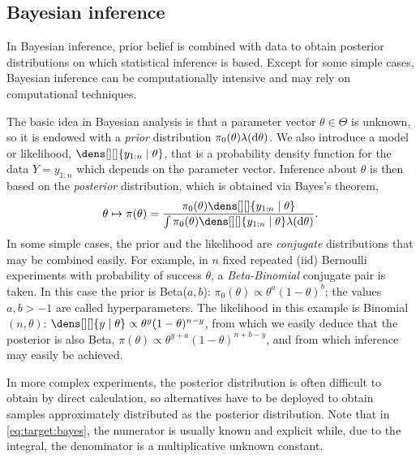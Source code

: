 \documentclass[english,graybox,envcountchap,envcountsame,sectrefs,shortlabels]{svmono}
\theoremstyle{style}
\begin{document}
\subsection{Bayesian inference}
In  Bayesian inference, prior belief  is combined with
data to obtain posterior distributions on which statistical inference is based.
Except for some simple cases, Bayesian inference can be computationally
intensive and may rely on  computational techniques.

The basic idea in Bayesian analysis is that a parameter vector $ \theta \in \Theta$ is unknown, so it is endowed with a \emph{prior} distribution
$\pi_0( \theta)\lambda(\mathrm{d} \theta)$.  We also
introduce a model or likelihood, $\dens[][]{ y_{1:n} \mid \theta}$, that is
a probability density function for the data $Y=y_{1:n}$ which depends on the parameter vector.
Inference about $ \theta$ is then based on the \emph{posterior}
distribution, which is obtained via Bayes's theorem,
\begin{equation} \label{eq:target:bayes}
\theta \mapsto \pi(\theta) =\frac{\pi_0( \theta) \dens[][]{ y_{1:n} \mid \theta}}{\int \pi_0( \theta) \dens[][]{ y_{1:n} \mid \theta} \lambda(\rmd \theta)}.
\end{equation}
  In some simple cases, the prior  and
the likelihood are \emph{conjugate}  distributions that may be combined easily.
For example, in $n$ fixed repeated (iid) Bernoulli experiments with probability of success $\theta$,
a \emph{Beta-Binomial} conjugate pair is taken.  In this case the prior is
Beta($a,b$):
$\pi_0(\theta) \propto \theta^{a} (1-\theta)^{b}$; the values $a,b > -1$  are called
hyperparameters. The likelihood in this example is
Binomial$(n,\theta)$:
$\dens[][]{ y \mid \theta} \propto \theta^y (1-\theta)^{n-y}$, from which
we easily deduce that the
posterior is also Beta,
$\pi ( \theta ) \propto \theta^{y+a}(1-\theta)^{n+b-y }
$, and from which inference may easily be achieved.

In more complex experiments, the posterior distribution is often difficult to obtain by direct calculation,
so alternatives have to be deployed to obtain samples approximately distributed as the posterior distribution. Note that in \eqref{eq:target:bayes}, the numerator is usually known and explicit while, due to the integral, the denominator is a multiplicative unknown constant.  
\end{document}
